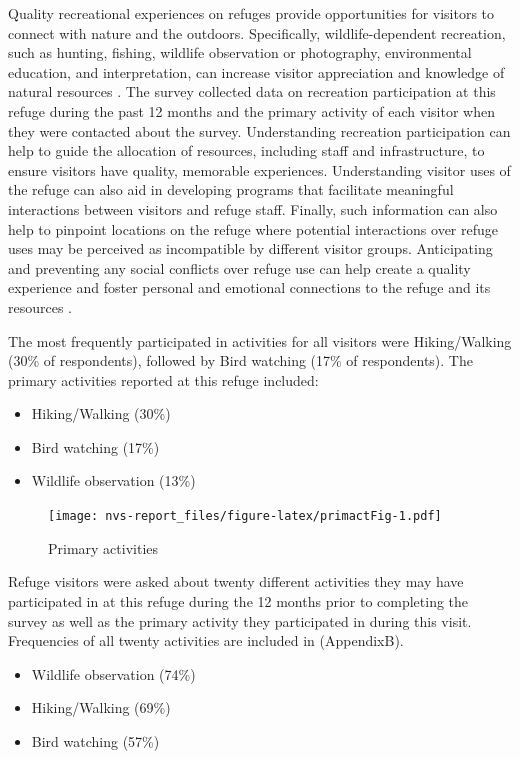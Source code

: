 \documentclass[]{book}
\providecommand{\tightlist}{%
  \setlength{\itemsep}{0pt}\setlength{\parskip}{0pt}}
\let\BeginKnitrBlock\begin \let\EndKnitrBlock\end
\begin{document}
\BeginKnitrBlock{heading4}
Quality recreational experiences on refuges provide opportunities for
visitors to connect with nature and the outdoors. Specifically,
wildlife-dependent recreation, such as hunting, fishing, wildlife
observation or photography, environmental education, and interpretation,
can increase visitor appreciation and knowledge of natural resources
\citep{USFWS2011}. The survey collected data on recreation participation
at this refuge during the past 12 months and the primary activity of
each visitor when they were contacted about the survey. Understanding
recreation participation can help to guide the allocation of resources,
including staff and infrastructure, to ensure visitors have quality,
memorable experiences. Understanding visitor uses of the refuge can also
aid in developing programs that facilitate meaningful interactions
between visitors and refuge staff. Finally, such information can also
help to pinpoint locations on the refuge where potential interactions
over refuge uses may be perceived as incompatible by different visitor
groups. Anticipating and preventing any social conflicts over refuge use
can help create a quality experience and foster personal and emotional
connections to the refuge and its resources \citep{USFWS2011}.
\EndKnitrBlock{heading4}

The most frequently participated in activities for all visitors were
Hiking/Walking (30\% of respondents), followed by Bird watching (17\% of
respondents). The primary activities reported at this refuge included:

\begin{itemize}
\tightlist
\item
  Hiking/Walking (30\%)
\item
  Bird watching (17\%)
\item
  Wildlife observation (13\%)
\end{itemize}

\begin{figure}
\centering
\texttt{[image: nvs-report\_files/figure-latex/primactFig-1.pdf]}
\caption{\label{fig:primactFig}Primary activities}
\end{figure}

Refuge visitors were asked about twenty different activities they may
have participated in at this refuge during the 12 months prior to
completing the survey as well as the primary activity they participated
in during this visit. Frequencies of all twenty activities are included
in (AppendixB).

\begin{itemize}
\tightlist
\item
  Wildlife observation (74\%)
\item
  Hiking/Walking (69\%)
\item
  Bird watching (57\%)
\end{itemize}
\end{document}
